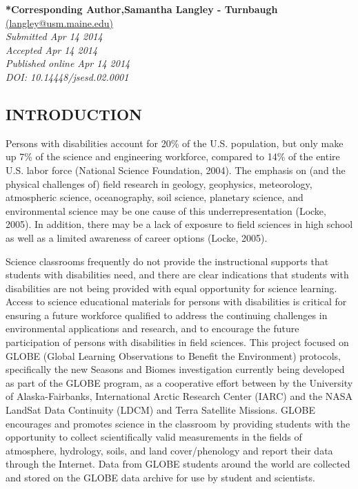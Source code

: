 \documentclass[11.5pt]{sig-alternate} %
\begin{document}
\textbf{*Corresponding Author,Samantha Langley - Turnbaugh }\\
\href{mailto:langley@usm.maine.edu}{(langley@usm.maine.edu)} \\
\textit{Submitted Apr 14 2014 }\\
\textit{Accepted Apr 14 2014} \\
\textit{Published online Apr 14 2014} \\
\textit{DOI: 10.14448/jsesd.02.0001} \\
\pagebreak
\clearpage
\begin{large}

\section*{INTRODUCTION}

Persons with disabilities account for 20\% of the U.S. population, but only make up 7\% of the science and engineering workforce, compared to 14\% of the entire U.S. labor force (National Science Foundation, 2004). The emphasis on (and the physical challenges of) field research in geology, geophysics, meteorology, atmospheric science, oceanography, soil science, planetary science, and environmental science may be one cause of this underrepresentation (Locke, 2005). In addition, there may be a lack of exposure to field sciences in high school as well as a limited awareness of career options (Locke, 2005).

Science classrooms frequently do not provide the instructional supports that students with disabilities need, and there are clear indications that students with disabilities are not being provided with equal opportunity for science learning. Access to science educational materials for persons with disabilities is critical for ensuring a future workforce qualified to address the continuing challenges in environmental applications and research, and to encourage the future participation of persons with disabilities in field sciences. 
 This project focused on GLOBE (Global Learning Observations to Benefit the Environment) protocols, specifically the new Seasons and Biomes investigation currently being developed as part of the GLOBE program, as a cooperative effort between by the University of Alaska-Fairbanks, International Arctic Research Center (IARC) and the NASA LandSat Data Continuity (LDCM) and Terra Satellite Missions. GLOBE encourages and promotes science in the classroom by providing students with the opportunity to collect scientifically valid measurements in the fields of atmosphere, hydrology, soils, and land cover/phenology and report their data through the Internet. Data from GLOBE students around the world are collected and stored on the GLOBE data archive for use by student and scientists.


\end{large}
\end{document}
